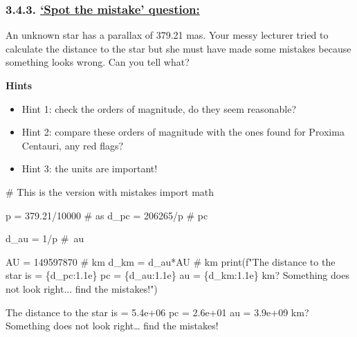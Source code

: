 \documentclass[
  letterpaper,
  DIV=11,
  numbers=noendperiod]{scrartcl}
\newenvironment{Shaded}{\begin{snugshade}}{\end{snugshade}}
\newcommand{\BuiltInTok}[1]{\textcolor[rgb]{0.00,0.23,0.31}{#1}}
\newcommand{\CommentTok}[1]{\textcolor[rgb]{0.37,0.37,0.37}{#1}}
\newcommand{\DecValTok}[1]{\textcolor[rgb]{0.68,0.00,0.00}{#1}}
\newcommand{\FloatTok}[1]{\textcolor[rgb]{0.68,0.00,0.00}{#1}}
\newcommand{\ImportTok}[1]{\textcolor[rgb]{0.00,0.46,0.62}{#1}}
\newcommand{\NormalTok}[1]{\textcolor[rgb]{0.00,0.23,0.31}{#1}}
\newcommand{\OperatorTok}[1]{\textcolor[rgb]{0.37,0.37,0.37}{#1}}
\newcommand{\SpecialCharTok}[1]{\textcolor[rgb]{0.37,0.37,0.37}{#1}}
\newcommand{\SpecialStringTok}[1]{\textcolor[rgb]{0.13,0.47,0.30}{#1}}
\providecommand{\tightlist}{%
  \setlength{\itemsep}{0pt}\setlength{\parskip}{0pt}}\usepackage{longtable,booktabs,array}
\begin{document}
\hypertarget{spot-the-mistake-question}{%
\subsubsection{\texorpdfstring{3.4.3. \protect\hyperlink{toc0_}{`Spot
the mistake'
question:}}{3.4.3. `Spot the mistake' question:}}\label{spot-the-mistake-question}}

An unknown star has a parallax of 379.21 mas. Your messy lecturer tried
to calculate the distance to the star but she must have made some
mistakes because something looks wrong. Can you tell what?

\textbf{Hints}

\begin{itemize}
\tightlist
\item
  Hint 1: check the orders of magnitude, do they seem reasonable?
\item
  Hint 2: compare these orders of magnitude with the ones found for
  Proxima Centauri, any red flags?
\item
  Hint 3: the units are important!
\end{itemize}

\begin{Shaded}
\begin{Highlighting}[]
\CommentTok{\# This is the version with mistakes}
\ImportTok{import}\NormalTok{ math}

\NormalTok{p }\OperatorTok{=} \FloatTok{379.21}\OperatorTok{/}\DecValTok{10000} \CommentTok{\# as }
\NormalTok{d\_pc }\OperatorTok{=} \DecValTok{206265}\OperatorTok{/}\NormalTok{p }\CommentTok{\# pc}

\NormalTok{d\_au }\OperatorTok{=} \DecValTok{1}\OperatorTok{/}\NormalTok{p }\CommentTok{\# au}

\NormalTok{AU }\OperatorTok{=} \DecValTok{149597870} \CommentTok{\# km}
\NormalTok{d\_km }\OperatorTok{=}\NormalTok{ d\_au}\OperatorTok{*}\NormalTok{AU }\CommentTok{\# km}
\BuiltInTok{print}\NormalTok{(}\SpecialStringTok{f"The distance to the star is = }\SpecialCharTok{\{}\NormalTok{d\_pc}\SpecialCharTok{:1.1e\}}\SpecialStringTok{ pc = }\SpecialCharTok{\{}\NormalTok{d\_au}\SpecialCharTok{:1.1e\}}\SpecialStringTok{ au = }\SpecialCharTok{\{}\NormalTok{d\_km}\SpecialCharTok{:1.1e\}}\SpecialStringTok{ km? Something does not look right... find the mistakes!"}\NormalTok{)}
\end{Highlighting}
\end{Shaded}

The distance to the star is = 5.4e+06 pc = 2.6e+01 au = 3.9e+09 km?
Something does not look right\ldots{} find the mistakes!
\end{document}
